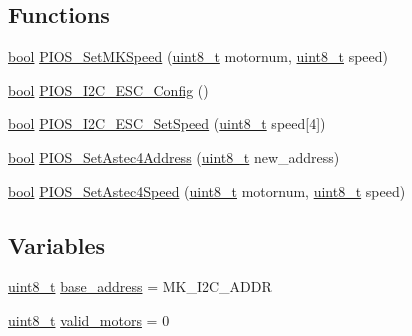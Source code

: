 \subsection*{Functions}
\begin{DoxyCompactItemize}
\item 
\hyperlink{group___exported__types_gaf6a258d8f3ee5206d682d799316314b1}{bool} \hyperlink{group___p_i_o_s___i2_c___e_s_c_ga2ac90c7dcac4c65027b9c5ecf404b6fb}{P\-I\-O\-S\-\_\-\-Set\-M\-K\-Speed} (\hyperlink{stdint_8h_aba7bc1797add20fe3efdf37ced1182c5}{uint8\-\_\-t} motornum, \hyperlink{stdint_8h_aba7bc1797add20fe3efdf37ced1182c5}{uint8\-\_\-t} speed)
\item 
\hyperlink{group___exported__types_gaf6a258d8f3ee5206d682d799316314b1}{bool} \hyperlink{group___p_i_o_s___i2_c___e_s_c_ga492a26bc0f2ba6af15d1a7fe404a5218}{P\-I\-O\-S\-\_\-\-I2\-C\-\_\-\-E\-S\-C\-\_\-\-Config} ()
\item 
\hyperlink{group___exported__types_gaf6a258d8f3ee5206d682d799316314b1}{bool} \hyperlink{group___p_i_o_s___i2_c___e_s_c_gae4ba1cbbf75c95f2613cf0bcbd977294}{P\-I\-O\-S\-\_\-\-I2\-C\-\_\-\-E\-S\-C\-\_\-\-Set\-Speed} (\hyperlink{stdint_8h_aba7bc1797add20fe3efdf37ced1182c5}{uint8\-\_\-t} speed\mbox{[}4\mbox{]})
\item 
\hyperlink{group___exported__types_gaf6a258d8f3ee5206d682d799316314b1}{bool} \hyperlink{group___p_i_o_s___i2_c___e_s_c_gaa3e804f2b7422fe94d7ffb0574db230b}{P\-I\-O\-S\-\_\-\-Set\-Astec4\-Address} (\hyperlink{stdint_8h_aba7bc1797add20fe3efdf37ced1182c5}{uint8\-\_\-t} new\-\_\-address)
\item 
\hyperlink{group___exported__types_gaf6a258d8f3ee5206d682d799316314b1}{bool} \hyperlink{group___p_i_o_s___i2_c___e_s_c_ga8c4dfebce118f053c3dbbbcfdafed2f6}{P\-I\-O\-S\-\_\-\-Set\-Astec4\-Speed} (\hyperlink{stdint_8h_aba7bc1797add20fe3efdf37ced1182c5}{uint8\-\_\-t} motornum, \hyperlink{stdint_8h_aba7bc1797add20fe3efdf37ced1182c5}{uint8\-\_\-t} speed)
\end{DoxyCompactItemize}
\subsection*{Variables}
\begin{DoxyCompactItemize}
\item 
\hyperlink{stdint_8h_aba7bc1797add20fe3efdf37ced1182c5}{uint8\-\_\-t} \hyperlink{group___p_i_o_s___i2_c___e_s_c_ga0c4e3e06d8215d52b552ef6c4a1d0994}{base\-\_\-address} = M\-K\-\_\-\-I2\-C\-\_\-\-A\-D\-D\-R
\item 
\hyperlink{stdint_8h_aba7bc1797add20fe3efdf37ced1182c5}{uint8\-\_\-t} \hyperlink{group___p_i_o_s___i2_c___e_s_c_gaea8017c294a3f74ac70b9bae773d7c0d}{valid\-\_\-motors} = 0
\end{DoxyCompactItemize}


